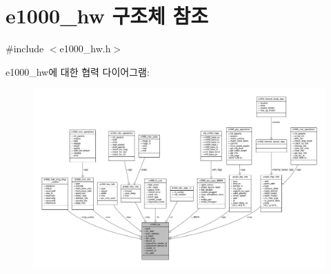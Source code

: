 \hypertarget{structe1000__hw}{}\section{e1000\+\_\+hw 구조체 참조}
\label{structe1000__hw}


{\ttfamily \#include $<$e1000\+\_\+hw.\+h$>$}



e1000\+\_\+hw에 대한 협력 다이어그램\+:
\nopagebreak
\begin{figure}[H]
\begin{center}
\leavevmode
\includegraphics[width=350pt]{structe1000__hw__coll__graph}
\end{center}
\end{figure}

